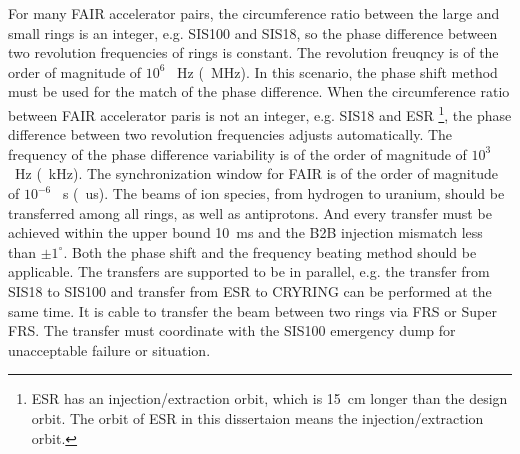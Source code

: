 For many FAIR accelerator pairs, the circumference ratio between the large and small rings is an integer, e.g. SIS100 and SIS18, so the phase difference between two revolution frequencies of rings is constant. The revolution freuqncy is of the order of magnitude of $10^6$ \SI{}{Hz} (\SI{}{MHz}). In this scenario, the phase shift method must be used for the match of the phase difference. When the circumference ratio between FAIR accelerator paris is not an integer, e.g. SIS18 and ESR \footnote{ESR has an injection/extraction orbit, which is \SI{15}{cm} longer than the design orbit. The orbit of ESR in this dissertaion means the injection/extraction orbit.}, the phase difference between two revolution frequencies adjusts automatically. The frequency of the phase difference variability is of the order of magnitude of $10^3$  \SI{}{Hz} (\SI{}{kHz}). The synchronization window for FAIR is of the order of magnitude of $10^{-6}$ \SI{}{s} (\SI{}{us}). The beams of ion species, from hydrogen to uranium, should be transferred among all rings, as well as antiprotons. And every transfer must be achieved within the upper bound \SI{10}{ms} and the B2B injection mismatch less than $\pm1^\circ$. Both the phase shift and the frequency beating method should be applicable. The transfers are supported to be in parallel, e.g. the transfer from SIS18 to SIS100 and transfer from ESR to CRYRING can be performed at the same time. It is cable to transfer the beam between two rings via FRS or Super FRS. The transfer must coordinate with the SIS100 emergency dump for unacceptable failure or situation. 


